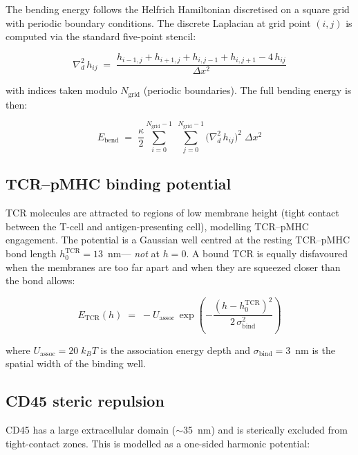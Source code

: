 \documentclass[11pt,a4paper]{article}
\begin{document}
The bending energy follows the Helfrich Hamiltonian discretised on a
square grid with periodic boundary conditions.  The discrete Laplacian
at grid point $(i,j)$ is computed via the standard five-point stencil:

\begin{equation}
  \label{eq:laplacian}
  \nabla^2_d\, h_{ij}
  \;=\;
  \frac{h_{i-1,j} + h_{i+1,j} + h_{i,j-1} + h_{i,j+1} - 4\,h_{ij}}
       {\Delta x^2}
\end{equation}

\noindent
with indices taken modulo $N_\text{grid}$ (periodic boundaries).  The
full bending energy is then:

\begin{equation}
  \label{eq:bending}
  E_\text{bend}
  \;=\;
  \frac{\kappa}{2}
  \sum_{i=0}^{N_\text{grid}-1}\;
  \sum_{j=0}^{N_\text{grid}-1}
    \bigl(\nabla^2_d\, h_{ij}\bigr)^2\;\Delta x^2
\end{equation}


\subsection{TCR--pMHC binding potential}

TCR molecules are attracted to regions of low membrane height
(tight contact between the T-cell and antigen-presenting cell),
modelling TCR--pMHC engagement.  The potential is a Gaussian well
centred at the resting TCR--pMHC bond length $h_0^\text{TCR}=13$~nm---%
\emph{not} at $h=0$.  A bound TCR is equally disfavoured when the membranes
are too far apart and when they are squeezed closer than the bond allows:

\begin{equation}
  \label{eq:tcr}
  E_\text{TCR}(h) \;=\; -U_\text{assoc}\,
    \exp\!\left(-\frac{(h-h_0^\text{TCR})^2}{2\,\sigma_\text{bind}^2}\right)
\end{equation}

\noindent
where $U_\text{assoc}=20\;k_BT$ is the association energy depth and
$\sigma_\text{bind}=3$~nm is the spatial width of the binding well.


\subsection{CD45 steric repulsion}

CD45 has a large extracellular domain ($\sim$35~nm) and is sterically
excluded from tight-contact zones.  This is modelled as a one-sided
harmonic potential:
\end{document}
